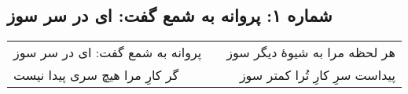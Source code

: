 \begin{center}
\section*{شماره ۱: پروانه به شمع گفت: ای در سر سوز}
\label{sec:001}
\begin{longtable}{l p{0.5cm} r}
پروانه به شمع گفت: ای در سر سوز
&&
هر لحظه مرا به شیوهٔ دیگر سوز
\\
گر کارِ مرا هیچ سری پیدا نیست
&&
پیداست سرِ کارِ تُرا کمتر سوز
\\
\end{longtable}
\end{center}
